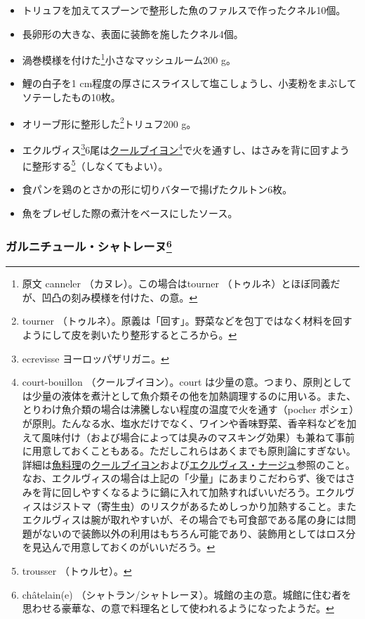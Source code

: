 \begin{recette}
\begin{itemize}
\item
  トリュフを加えてスプーンで整形した魚のファルスで作ったクネル10個。
\item
  長卵形の大きな、表面に装飾を施したクネル4個。
\item
  渦巻模様を付けた\footnote{原文 canneler （カヌレ）。この場合はtourner
    （トゥルネ）とほぼ同義だが、凹凸の刻み模様を付けた、の意。}小さなマッシュルーム200
  g。
\item
  鯉の白子を1
  cm程度の厚さにスライスして塩こしょうし、小麦粉をまぶしてソテーしたもの10枚。
\item
  オリーブ形に整形した\footnote{tourner
    （トゥルネ）。原義は「回す」。野菜などを包丁ではなく材料を回すようにして皮を剥いたり整形するところから。}トリュフ200
  g。
\item
  エクルヴィス\footnote{ecrevisse ヨーロッパザリガニ。}6尾は\protect\hyperlink{courtbouillon-a}{クールブイヨン}\footnote{court-bouillon
    （クールブイヨン）。court
    は少量の意。つまり、原則としては少量の液体を煮汁として魚介類その他を加熱調理するのに用いる。また、とりわけ魚介類の場合は沸騰しない程度の温度で火を通す（pocher
    ポシェ）が原則。たんなる水、塩水だけでなく、ワインや香味野菜、香辛料などを加えて風味付け（および場合によっては臭みのマスキング効果）も兼ねて事前に用意しておくこともある。ただしこれらはあくまでも原則論にすぎない。詳細は\protect\hyperlink{poissons}{魚料理}の\protect\hyperlink{serie-de-courts-bouillons-de-poisson}{クールブイヨン}および\protect\hyperlink{ecrevisse-a-la-nage}{エクルヴィス・ナージュ}参照のこと。なお、エクルヴィスの場合は上記の「少量」にあまりこだわらず、後ではさみを背に回しやすくなるように鍋に入れて加熱すればいいだろう。エクルヴィスはジストマ（寄生虫）のリスクがあるためしっかり加熱すること。またエクルヴィスは腕が取れやすいが、その場合でも可食部である尾の身には問題がないので装飾以外の利用はもちろん可能であり、装飾用としてはロス分を見込んで用意しておくのがいいだろう。}で火を通すし、はさみを背に回すように整形する\footnote{trousser
    （トゥルセ）。}（しなくてもよい）。
\item
  食パンを鶏のとさかの形に切りバターで揚げたクルトン6枚。
\item
  魚をブレゼした際の煮汁をベースにしたソース。
\end{itemize}

\hypertarget{garniture-chatelaine}{%
\subsubsection[ガルニチュール・シャトレーヌ]{\texorpdfstring{ガルニチュール・シャトレーヌ\footnote{châtelain(e)
  （シャトラン/シャトレーヌ）。城館の主の意。城館に住む者を思わせる豪華な、の意で料理名として使われるようになったようだ。}}{ガルニチュール・シャトレーヌ}}\label{garniture-chatelaine}}


\end{recette}
